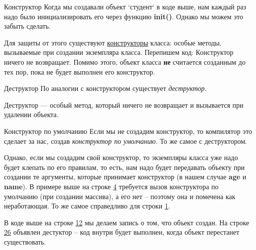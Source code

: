 \begin{lecture}[\lectureSubject]
	\begin{lecSection}
		\begin{lecSubsection}{Конструктор}
		Когда мы создавали объект `студент` в коде выше, нам каждый раз надо было инициализировать его через функцию \textbf{init()}. Однако мы можем это забыть сделать.
		
		Для защиты от этого существуют \underline{конструкторы} класса: особые методы, вызываемые при создании экземпляра класса. Перепишем код:
		Конструктор ничего не возвращает. Помимо этого, объект класса \textbf{не} считается созданным до тех пор, пока не будет выполнен его конструктор.
		\end{lecSubsection}
		
		\begin{lecSubsection}{Деструктор}
		По аналогии с конструктором существует \textit{деструктор}.
		
		Деструктор --- особый метод, который ничего не возвращает и вызывается при удалении объекта.
		\end{lecSubsection}
		\begin{lecSubsection}{Конструктор по умолчанию}
			Если мы не создадим конструктор, то компилятор это сделает за нас, создав \textit{конструктор по умолчанию}. То же самое с деструктором.
			
			Однако, если мы создадим свой конструктор, то экземпляры класса уже надо будет клепать по его правилам, то есть, нам надо будет передавать объекту при создании те аргументы, которые принимает конструктор (в нашем случае \textbf{age} и \textbf{name}).
			В примере выше на строке \underline{4} требуется вызов конструктора по умолчанию (при создании массива), а его нет -- поэтому она и помечена как неработающая. То же самое справедливо для строки \underline{1}.
			\newpage
		\end{lecSubsection}
		\begin{lecSection}
			В коде выше на строке \underline{12} мы делаем запись о том, что объект создан. На строке \underline{26} объявлен дестуктор -- код внутри будет выполнен, когда объект перестанет существовать.
			

\end{lecSection}
\end{lecSection}
\end{lecture}
